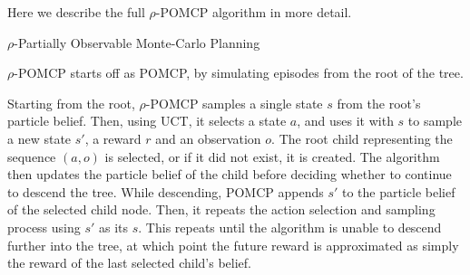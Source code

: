 Here we describe the full $\rho$-POMCP algorithm in more detail.

\begin{algorithm}[H]
    \caption{$\rho$-Partially Observable Monte-Carlo Planning}
\begin{multicols}{2}


    \setcounter{AlgoLine}{0}
\end{multicols}
\end{algorithm}

$\rho$-POMCP starts off as POMCP, by simulating episodes from the root of the tree.

Starting from the root, $\rho$-POMCP samples a single state $s$ from the root's particle belief.
Then, using UCT, it selects a state $a$, and uses it with $s$ to sample a new state $s'$, a reward
$r$ and an observation $o$. The root child representing the sequence $(a,o)$ is selected, or if it
did not exist, it is created. The algorithm then updates the particle belief of the child before
deciding whether to continue to descend the tree. While descending, POMCP appends $s'$ to the
particle belief of the selected child node. Then, it repeats the action selection and sampling
process using $s'$ as its $s$. This repeats until the algorithm is unable to descend further into
the tree, at which point the future reward is approximated as simply the reward of the last
selected child's belief.

